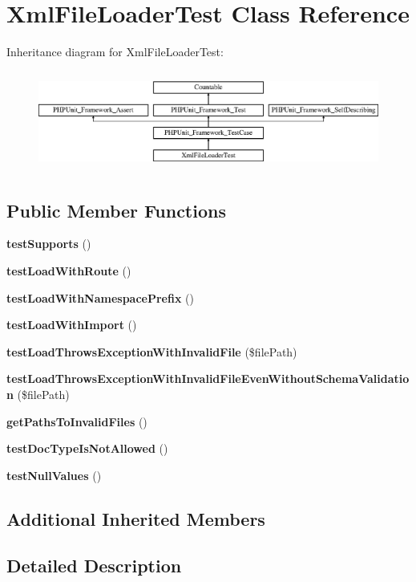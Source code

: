 \section{Xml\+File\+Loader\+Test Class Reference}
\label{class_symfony_1_1_component_1_1_routing_1_1_tests_1_1_loader_1_1_xml_file_loader_test}
Inheritance diagram for Xml\+File\+Loader\+Test\+:\begin{figure}[H]
\begin{center}
\leavevmode
\includegraphics[height=3.303835cm]{class_symfony_1_1_component_1_1_routing_1_1_tests_1_1_loader_1_1_xml_file_loader_test}
\end{center}
\end{figure}
\subsection*{Public Member Functions}
\begin{DoxyCompactItemize}
\item 
{\bf test\+Supports} ()
\item 
{\bf test\+Load\+With\+Route} ()
\item 
{\bf test\+Load\+With\+Namespace\+Prefix} ()
\item 
{\bf test\+Load\+With\+Import} ()
\item 
{\bf test\+Load\+Throws\+Exception\+With\+Invalid\+File} (\$file\+Path)
\item 
{\bf test\+Load\+Throws\+Exception\+With\+Invalid\+File\+Even\+Without\+Schema\+Validation} (\$file\+Path)
\item 
{\bf get\+Paths\+To\+Invalid\+Files} ()
\item 
{\bf test\+Doc\+Type\+Is\+Not\+Allowed} ()
\item 
{\bf test\+Null\+Values} ()
\end{DoxyCompactItemize}
\subsection*{Additional Inherited Members}


\subsection{Detailed Description}


